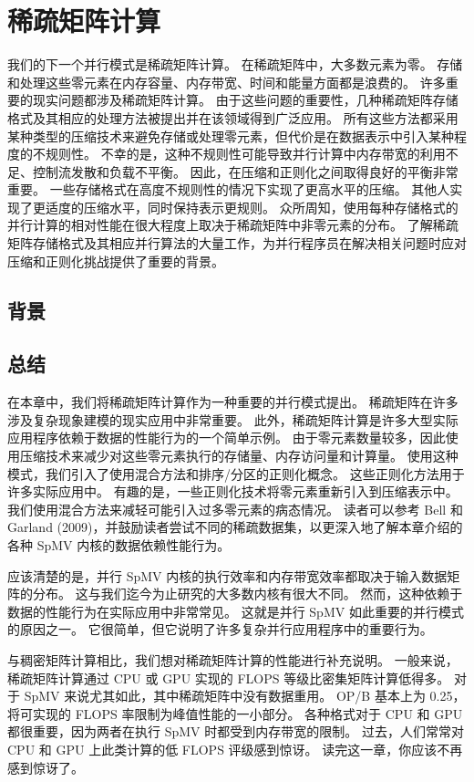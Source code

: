 \section{稀疏矩阵计算}
我们的下一个并行模式是稀疏矩阵计算。 在稀疏矩阵中，大多数元素为零。 存储和处理这些零元素在内存容量、内存带宽、时间和能量方面都是浪费的。 许多重要的现实问题都涉及稀疏矩阵计算。 由于这些问题的重要性，几种稀疏矩阵存储格式及其相应的处理方法被提出并在该领域得到广泛应用。 所有这些方法都采用某种类型的压缩技术来避免存储或处理零元素，但代价是在数据表示中引入某种程度的不规则性。 不幸的是，这种不规则性可能导致并行计算中内存带宽的利用不足、控制流发散和负载不平衡。 因此，在压缩和正则化之间取得良好的平衡非常重要。 一些存储格式在高度不规则性的情况下实现了更高水平的压缩。 其他人实现了更适度的压缩水平，同时保持表示更规则。 众所周知，使用每种存储格式的并行计算的相对性能在很大程度上取决于稀疏矩阵中非零元素的分布。 了解稀疏矩阵存储格式及其相应并行算法的大量工作，为并行程序员在解决相关问题时应对压缩和正则化挑战提供了重要的背景。

\subsection{背景}

\subsection{总结}
在本章中，我们将稀疏矩阵计算作为一种重要的并行模式提出。 稀疏矩阵在许多涉及复杂现象建模的现实应用中非常重要。 此外，稀疏矩阵计算是许多大型实际应用程序依赖于数据的性能行为的一个简单示例。 由于零元素数量较多，因此使用压缩技术来减少对这些零元素执行的存储量、内存访问量和计算量。 使用这种模式，我们引入了使用混合方法和排序/分区的正则化概念。 这些正则化方法用于许多实际应用中。 有趣的是，一些正则化技术将零元素重新引入到压缩表示中。 我们使用混合方法来减轻可能引入过多零元素的病态情况。 读者可以参考 Bell 和 Garland (2009)，并鼓励读者尝试不同的稀疏数据集，以更深入地了解本章介绍的各种 SpMV 内核的数据依赖性能行为。

应该清楚的是，并行 SpMV 内核的执行效率和内存带宽效率都取决于输入数据矩阵的分布。 这与我们迄今为止研究的大多数内核有很大不同。 然而，这种依赖于数据的性能行为在实际应用中非常常见。 这就是并行 SpMV 如此重要的并行模式的原因之一。 它很简单，但它说明了许多复杂并行应用程序中的重要行为。

与稠密矩阵计算相比，我们想对稀疏矩阵计算的性能进行补充说明。 一般来说，稀疏矩阵计算通过 CPU 或 GPU 实现的 FLOPS 等级比密集矩阵计算低得多。 对于 SpMV 来说尤其如此，其中稀疏矩阵中没有数据重用。 OP/B 基本上为 0.25，将可实现的 FLOPS 率限制为峰值性能的一小部分。 各种格式对于 CPU 和 GPU 都很重要，因为两者在执行 SpMV 时都受到内存带宽的限制。 过去，人们常常对 CPU 和 GPU 上此类计算的低 FLOPS 评级感到惊讶。 读完这一章，你应该不再感到惊讶了。
